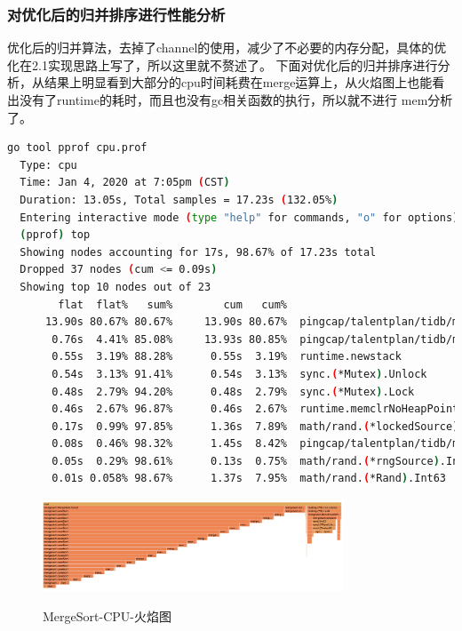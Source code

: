 \documentclass[UTF8]{ctexart}
\begin{document}
\subsubsection{对优化后的归并排序进行性能分析}
优化后的归并算法，去掉了channel的使用，减少了不必要的内存分配，具体的优化在2.1实现思路上写了，所以这里就不赘述了。
下面对优化后的归并排序进行分析，从结果上明显看到大部分的cpu时间耗费在merge运算上，从火焰图上也能看出没有了runtime的耗时，而且也没有gc相关函数的执行，所以就不进行
mem分析了。
\begin{lstlisting}[language=bash]
  go tool pprof cpu.prof                                                                                                      
  Type: cpu
  Time: Jan 4, 2020 at 7:05pm (CST)
  Duration: 13.05s, Total samples = 17.23s (132.05%)
  Entering interactive mode (type "help" for commands, "o" for options)
  (pprof) top
  Showing nodes accounting for 17s, 98.67% of 17.23s total
  Dropped 37 nodes (cum <= 0.09s)
  Showing top 10 nodes out of 23
        flat  flat%   sum%        cum   cum%
      13.90s 80.67% 80.67%     13.90s 80.67%  pingcap/talentplan/tidb/mergesort.merge
       0.76s  4.41% 85.08%     13.93s 80.85%  pingcap/talentplan/tidb/mergesort.coreSort
       0.55s  3.19% 88.28%      0.55s  3.19%  runtime.newstack
       0.54s  3.13% 91.41%      0.54s  3.13%  sync.(*Mutex).Unlock
       0.48s  2.79% 94.20%      0.48s  2.79%  sync.(*Mutex).Lock
       0.46s  2.67% 96.87%      0.46s  2.67%  runtime.memclrNoHeapPointers
       0.17s  0.99% 97.85%      1.36s  7.89%  math/rand.(*lockedSource).Int63
       0.08s  0.46% 98.32%      1.45s  8.42%  pingcap/talentplan/tidb/mergesort.prepare
       0.05s  0.29% 98.61%      0.13s  0.75%  math/rand.(*rngSource).Int63
       0.01s 0.058% 98.67%      1.37s  7.95%  math/rand.(*Rand).Int63
\end{lstlisting}

\begin{figure}[H]
  \centering
  \includegraphics[width=0.8\textwidth]{fig/cpu.png}\\
  \caption{MergeSort-CPU-火焰图}
  \label{mre1}
\end{figure}
\end{document}
